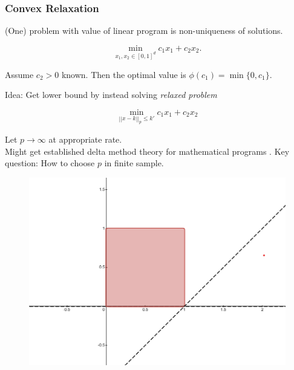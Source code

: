 \documentclass[11pt, aspectratio=169]{beamer}
\begin{document}
\begin{frame}[label=convex_relax]
    \frametitle{Convex Relaxation}

    (One) problem with value of linear program is non-uniqueness of solutions.

    \begin{equation*}
        \min_{x_1, x_2\in[0,1]^d} c_1 x_1 + c_2 x_2.
    \end{equation*}

    \vspace{0.5cm}
    Assume $c_2 > 0$ known. Then the optimal value is $\phi(c_1) = \min\{0, c_1\}$.

    \vspace{0.5cm}
    Idea: Get lower bound by instead solving \textit{relaxed problem}

    \begin{equation*}
        \min_{||x-k||_p\leq k'} c_1x_1 + c_2x_2
    \end{equation*}

    Let $p\to\infty$ at appropriate rate.\\
    Might get established delta method theory for mathematical programs \citep{shapiro1991asymptotic}.
    Key question: How to choose $p$ in finite sample.

    \footnotesize  \hyperlink{outlook_relax}{}

\end{frame}

\begin{frame}
    \begin{figure}
        \includegraphics[height=0.9\textheight]{desmos_only_box.png}
    \end{figure}
\end{frame}
\end{document}
